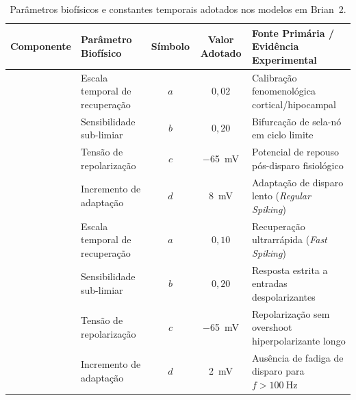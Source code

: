 \begin{table}[tbp]
    \centering
    \small
    \setlength{\tabcolsep}{4pt}
    \caption{Parâmetros biofísicos e constantes temporais adotados nos modelos em \textsf{Brian~2}.}
    \label{tab:parametros_biofisicos_brian2}
    \begin{adjustbox}{max width=0.98\textwidth}
        \begin{tabular}{llccl}
            \toprule
            \textbf{Componente} & \textbf{Parâmetro Biofísico} & \textbf{Símbolo} & \textbf{Valor Adotado} & \textbf{Fonte Primária / Evidência Experimental} \\
            \midrule
                                & Escala temporal de recuperação   & $a$                 & $0{,}02$                  & Calibração fenomenológica cortical/hipocampal \cite{izhikevich2003} \\
                                & Sensibilidade sub-limiar         & $b$                 & $0{,}20$                  & Bifurcação de sela-nó em ciclo limite \cite{izhikevich2003} \\
                                & Tensão de repolarização          & $c$                 & \qty{-65}{\milli\volt}    & Potencial de repouso pós-disparo fisiológico \cite{izhikevich2003} \\
                                & Incremento de adaptação          & $d$                 & \qty{8}{\milli\volt}      & Adaptação de disparo lento (\emph{Regular Spiking}) \cite{izhikevich2003} \\
            \midrule
                                & Escala temporal de recuperação   & $a$                 & $0{,}10$                  & Recuperação ultrarrápida (\emph{Fast Spiking}) \cite{izhikevich2003} \\
                                & Sensibilidade sub-limiar         & $b$                 & $0{,}20$                  & Resposta estrita a entradas despolarizantes \cite{izhikevich2003} \\
                                & Tensão de repolarização          & $c$                 & \qty{-65}{\milli\volt}    & Repolarização sem overshoot hiperpolarizante longo \cite{izhikevich2003} \\
                                & Incremento de adaptação          & $d$                 & \qty{2}{\milli\volt}      & Ausência de fadiga de disparo para $f > \qty{100}{\hertz}$ \cite{izhikevich2003} \\

\end{tabular}
\end{adjustbox}
\end{table}
